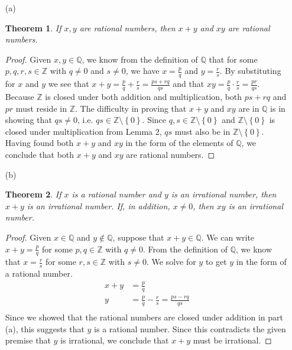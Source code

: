 \documentclass[12pt]{article}
\newtheorem*{thm}{Theorem}
\begin{document}
\begin{itemize}
\item[(a)]
\begin{thm}
If $x, y$ are rational numbers, then $x + y$ and $xy$ are rational numbers.
\end{thm}
\begin{proof}
Given $x, y \in \mathbb{Q}$, we know from the definition of $\mathbb{Q}$ that for some $p,q,r,s \in \mathbb{Z}$ with $q \neq 0$ and $s \neq 0$, we have $x = \frac{p}{q}$ and $y = \frac{r}{s}$. By substituting for $x$ and $y$ we see that $x + y = \frac{p}{q} + \frac{r}{s} = \frac{ps + rq}{qs}$ and that $xy = \frac{p}{q} \cdot \frac{r}{s} = \frac{pr}{qs}$. Because $\mathbb{Z}$ is closed under both addition and multiplication, both $ps + rq$ and $pr$ must reside in $\mathbb{Z}$. The difficulty in proving that $x + y$ and $xy$ are in $\mathbb{Q}$ is in showing that $qs \neq 0$, i.e. $qs \in \mathbb{Z} \setminus \left\{0\right\}$. Since $q, s \in \mathbb{Z} \setminus \left\{0\right\}$ and $\mathbb{Z} \setminus \left\{0\right\}$ is closed under multiplication from Lemma 2, $qs$ must also be in $\mathbb{Z} \setminus \left\{0\right\}$. Having found both $x + y$ and $xy$ in the form of the elements of $\mathbb{Q}$, we conclude that both $x + y$ and $xy$ are rational numbers.
\end{proof}
\item[(b)]
\begin{thm}
If $x$ is a rational number and $y$ is an irrational number, then $x + y$ is an irrational number. If, in addition, $x \neq 0$, then $xy$ is an irrational number.
\end{thm}
\begin{proof}
Given $x \in \mathbb{Q}$ and $y \notin \mathbb{Q}$, suppose that $x + y \in \mathbb{Q}$. We can write $x + y = \frac{p}{q}$ for some $p, q \in \mathbb{Z}$ with $q \neq 0$. From the definition of $\mathbb{Q}$, we know that $x = \frac{r}{s}$ for some $r, s \in \mathbb{Z}$ with $s \neq 0$. We solve for $y$ to get $y$ in the form of a rational number.
\begin{align*}
x + y &= \frac{p}{q} \\
y &= \frac{p}{q} - \frac{r}{s} = \frac{ps - rq}{qs} \\
\end{align*}
Since we showed that the rational numbers are closed under addition in part (a), this suggests that $y$ is a rational number. Since this contradicts the given premise that $y$ is irrational, we conclude that $x + y$ must be irrational.


\end{proof}
\end{itemize}
\end{document}

